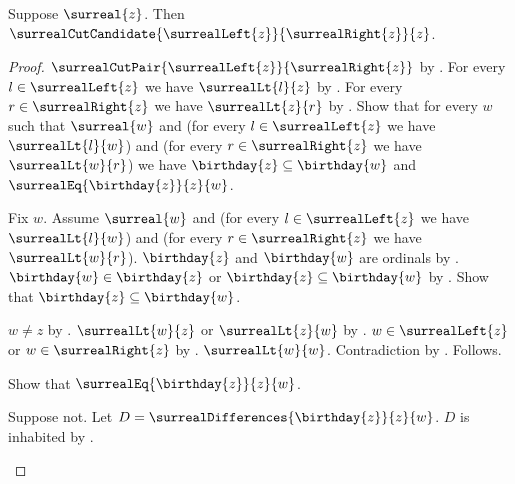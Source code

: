 \begin{theorem}\label{surreal_options_cut_candidate}
    Suppose $\surreal{z}$.
    Then $\surrealCutCandidate{\surrealLeft{z}}{\surrealRight{z}}{z}$.
\end{theorem}
\begin{proof}
    $\surrealCutPair{\surrealLeft{z}}{\surrealRight{z}}$
        by .
    For every $l\in\surrealLeft{z}$ we have $\surrealLt{l}{z}$
        by .
    For every $r\in\surrealRight{z}$ we have $\surrealLt{z}{r}$
        by .
    Show that for every $w$ such that
        $\surreal{w}$ and
        (for every $l\in\surrealLeft{z}$ we have $\surrealLt{l}{w}$) and
        (for every $r\in\surrealRight{z}$ we have $\surrealLt{w}{r}$)
        we have $\birthday{z}\subseteq\birthday{w}$ and
            $\surrealEq{\birthday{z}}{z}{w}$.
    \begin{subproof}
        Fix $w$.
        Assume $\surreal{w}$ and
            (for every $l\in\surrealLeft{z}$ we have $\surrealLt{l}{w}$) and
            (for every $r\in\surrealRight{z}$ we have $\surrealLt{w}{r}$).
        $\birthday{z}$ and $\birthday{w}$ are ordinals
            by .
        $\birthday{w}\in\birthday{z}$ or
            $\birthday{z}\subseteq\birthday{w}$
            by .
        Show that $\birthday{z}\subseteq\birthday{w}$.
        \begin{subproof}
            \begin{byCase}
                    $w\neq z$ by .
                    $\surrealLt{w}{z}$ or $\surrealLt{z}{w}$
                        by .
                    $w\in\surrealLeft{z}$ or
                        $w\in\surrealRight{z}$
                        by .
                    $\surrealLt{w}{w}$.
                    Contradiction by .
                    Follows.
            \end{byCase}
        \end{subproof}
        Show that $\surrealEq{\birthday{z}}{z}{w}$.
        \begin{subproof}
            Suppose not.
            Let $D=\surrealDifferences{\birthday{z}}{z}{w}$.
            $D$ is inhabited
                by .

\end{subproof}
\end{subproof}
\end{proof}
